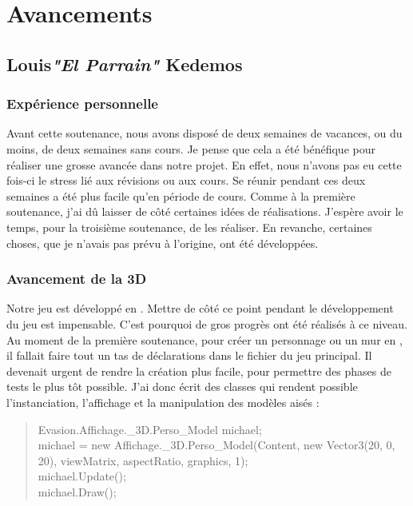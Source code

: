 \documentclass{article}
\begin{document}
\section{Avancements}
\subsection{Louis\textcolor{pseudoblue}{\textit{"El Parrain"}} Kedemos}

\subsubsection{Expérience personnelle}
Avant cette soutenance, nous avons disposé de deux semaines de vacances, ou du moins, de deux semaines sans cours. Je pense que cela a été bénéfique pour réaliser une grosse avancée dans notre projet. En effet, nous n'avons pas eu cette fois-ci le stress lié aux révisions ou aux cours. Se réunir pendant ces deux semaines a été plus facile qu'en période de cours. \newline
Comme à la première soutenance, j'ai dû laisser de côté certaines idées de réalisations. J'espère avoir le temps, pour la troisième soutenance, de les réaliser. En revanche, certaines choses, que je n'avais pas prévu à l'origine, ont été développées.

\subsubsection{Avancement de la 3D}
Notre jeu est développé en . Mettre de côté ce point pendant le développement du jeu est impensable. C'est pourquoi de gros progrès ont été réalisés à ce niveau. Au moment de la première soutenance, pour créer un personnage ou un mur en , il fallait faire tout un tas de déclarations dans le fichier du jeu principal. Il devenait urgent de rendre la création  plus facile, pour permettre des phases de tests le plus tôt possible. J'ai donc écrit des classes qui rendent possible l'instanciation, l'affichage et la manipulation des modèles  aisés :

\begin{quote}
\textcolor{texteGris}{
Evasion.Affichage.\_3D.Perso\_Model michael;\\
michael = new Affichage.\_3D.Perso\_Model(Content, new Vector3(20, 0, 20), viewMatrix, aspectRatio, graphics, 1);\\
michael.Update();\\
michael.Draw();}
\end{quote}
\end{document}
